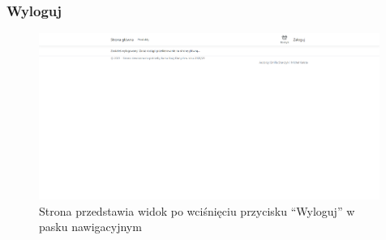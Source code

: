 \documentclass{article}
\begin{document}
\subsubsection{Wyloguj}
\begin{figure}[H]
   \centering
   \includegraphics[width=0.99\textwidth,frame]{Wyglad/wylogowanie_admin.png}
   \caption{Strona przedstawia widok po wciśnięciu przycisku ``Wyloguj'' w pasku nawigacyjnym}
\end{figure}
\end{document}
